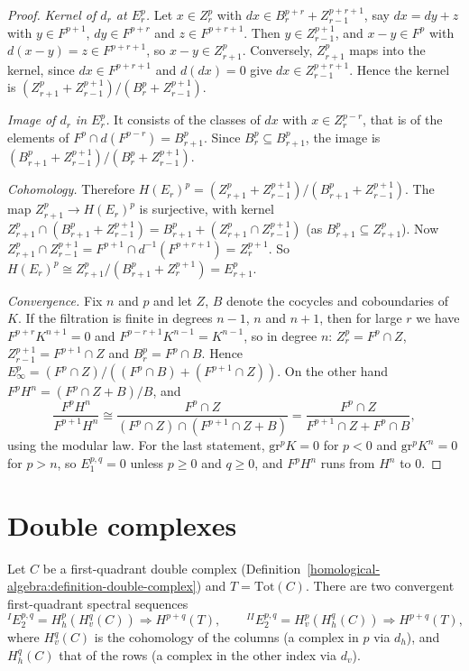 \begin{proof}
\emph{Kernel of $d_r$ at $E_r^p$.} Let $x \in Z_r^p$ with $dx \in B_r^{p+r} + Z_{r-1}^{p+r+1}$, say $dx = dy + z$ with $y \in F^{p+1}$,
$dy \in F^{p+r}$ and $z \in F^{p+r+1}$. Then $y \in Z_{r-1}^{p+1}$, and $x - y \in F^p$ with $d(x - y) = z \in F^{p+r+1}$, so
$x - y \in Z_{r+1}^p$. Conversely, $Z_{r+1}^p$ maps into the kernel, since $dx \in F^{p+r+1}$ and $d(dx) = 0$ give
$dx \in Z_{r-1}^{p+r+1}$. Hence the kernel is $(Z_{r+1}^p + Z_{r-1}^{p+1})/(B_r^p + Z_{r-1}^{p+1})$.

\emph{Image of $d_r$ in $E_r^p$.} It consists of the classes of $dx$ with $x \in Z_r^{p-r}$, that is of the elements of
$F^p \cap d(F^{p-r}) = B_{r+1}^p$. Since $B_r^p \subseteq B_{r+1}^p$, the image is $(B_{r+1}^p + Z_{r-1}^{p+1})/(B_r^p + Z_{r-1}^{p+1})$.

\emph{Cohomology.} Therefore
$H(E_r)^p = (Z_{r+1}^p + Z_{r-1}^{p+1})/(B_{r+1}^p + Z_{r-1}^{p+1})$. The map $Z_{r+1}^p \to H(E_r)^p$ is surjective, with kernel
$Z_{r+1}^p \cap (B_{r+1}^p + Z_{r-1}^{p+1}) = B_{r+1}^p + (Z_{r+1}^p \cap Z_{r-1}^{p+1})$ (as $B_{r+1}^p \subseteq Z_{r+1}^p$). Now
$Z_{r+1}^p \cap Z_{r-1}^{p+1} = F^{p+1} \cap d^{-1}(F^{p+r+1}) = Z_r^{p+1}$. So $H(E_r)^p \cong Z_{r+1}^p/(B_{r+1}^p + Z_r^{p+1}) = E_{r+1}^p$.

\emph{Convergence.} Fix $n$ and $p$ and let $Z$, $B$ denote the cocycles and coboundaries of $K$. If the filtration is finite in degrees
$n - 1$, $n$ and $n + 1$, then for large $r$ we have $F^{p+r}K^{n+1} = 0$ and $F^{p-r+1}K^{n-1} = K^{n-1}$, so in degree $n$:
$Z_r^p = F^p \cap Z$, $Z_{r-1}^{p+1} = F^{p+1} \cap Z$ and $B_r^p = F^p \cap B$. Hence
$E_\infty^p = (F^p \cap Z)/((F^p \cap B) + (F^{p+1} \cap Z))$. On the other hand $F^pH^n = (F^p \cap Z + B)/B$, and
\[
\frac{F^pH^n}{F^{p+1}H^n} \cong \frac{F^p \cap Z}{(F^p \cap Z) \cap (F^{p+1} \cap Z + B)} = \frac{F^p \cap Z}{F^{p+1} \cap Z + F^p \cap B},
\]
using the modular law. For the last statement, $\mathrm{gr}^pK = 0$ for $p < 0$ and $\mathrm{gr}^pK^n = 0$ for $p > n$, so $E_1^{p,q} = 0$ unless
$p \geq 0$ and $q \geq 0$, and $F^pH^n$ runs from $H^n$ to $0$.
\end{proof}

\section{Double complexes}\label{spectral-sequences:section-double-complexes}

\begin{theorem}\label{spectral-sequences:theorem-double-complex}
Let $C$ be a first-quadrant double complex (Definition~\ref{homological-algebra:definition-double-complex}) and $T = \mathrm{Tot}(C)$.
There are two convergent first-quadrant spectral sequences
\[
{}^{I}E_2^{p,q} = H^p_h(H^q_v(C)) \Rightarrow H^{p+q}(T), \qquad {}^{II}E_2^{p,q} = H^p_v(H^q_h(C)) \Rightarrow H^{p+q}(T),
\]
where $H_v^q(C)$ is the cohomology of the columns (a complex in $p$ via $d_h$), and $H_h^q(C)$ that of the rows (a complex in the
other index via $d_v$).
\end{theorem}

